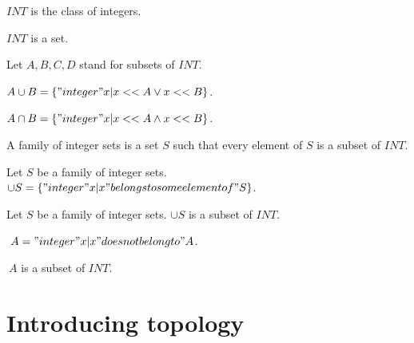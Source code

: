 \documentclass{article}
\begin{document}
  \begin{forthel}
    \begin{definition}
      $INT$ is the class of integers.
    \end{definition}

    \begin{axiom}
      $INT$ is a set.
    \end{axiom}

    Let $A,B,C,D$ stand for subsets of $INT$.

    \begin{definition}[Union]
      $A \cup B = \{ "integer" x | x << A \vee x << B \}$.
    \end{definition}

    \begin{definition}[Intersection]
      $A \cap B = \{ "integer" x | x << A \wedge x << B \}$.
    \end{definition}

    \begin{definition}[IntegerSets]
      A family of integer sets is a set $S$ such that every element of $S$ is a subset of $INT$.
    \end{definition}

    \begin{definition}[UnionSet]
      Let $S$ be a family of integer sets.
      $\cup S = \{ "integer" x | x "belongs to some element of" S \}$.
    \end{definition}

    \begin{lemma}
      Let $S$ be a family of integer sets. $\cup S$ is a subset of $INT$.
    \end{lemma}

    \begin{definition}[Complement]
      $~ A = { "integer" x | x "does not belong to" A }$.
    \end{definition}

    \begin{lemma}
      $~ A$ is a subset of $INT$.
    \end{lemma}
   \end{forthel}


  \section{Introducing topology}
\end{document}
